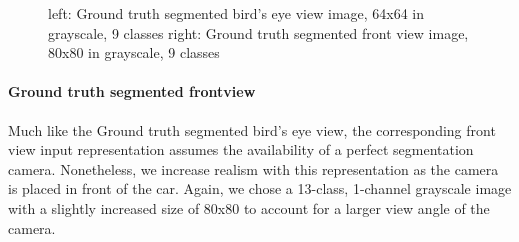 \documentclass[letterpaper, 10 pt, conference]{ieeeconf}  %
\begin{document}
\begin{figure}[thpb]
    \centering
    \caption{left: Ground truth segmented bird's eye view image, 64x64 in grayscale, 9 classes
    right: Ground truth segmented front view image, 80x80 in grayscale, 9 classes}
        \label{figurelabel}
        \end{figure}

\paragraph{Ground truth segmented frontview}
Much like the Ground truth segmented bird's eye view, the corresponding front view input representation assumes the availability of a 
perfect segmentation camera. Nonetheless, we increase realism with this representation as the camera is placed in front of the car.
Again, we chose a 13-class, 1-channel grayscale image with a slightly increased size of 80x80 to account for a larger view angle of the 
camera. 
\end{document}
